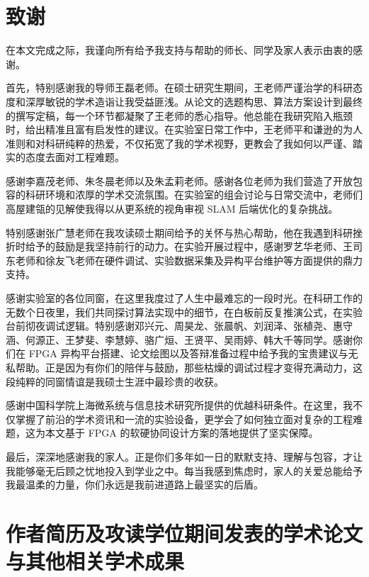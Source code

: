 \chapter[致谢]{致\quad 谢}

在本文完成之际，我谨向所有给予我支持与帮助的师长、同学及家人表示由衷的感谢。

首先，特别感谢我的导师王磊老师。在硕士研究生期间，王老师严谨治学的科研态度和深厚敏锐的学术造诣让我受益匪浅。从论文的选题构思、算法方案设计到最终的撰写定稿，每一个环节都凝聚了王老师的悉心指导。他总能在我研究陷入瓶颈时，给出精准且富有启发性的建议。在实验室日常工作中，王老师平和谦逊的为人准则和对科研纯粹的热爱，不仅拓宽了我的学术视野，更教会了我如何以严谨、踏实的态度去面对工程难题。

感谢李嘉茂老师、朱冬晨老师以及朱孟莉老师。感谢各位老师为我们营造了开放包容的科研环境和浓厚的学术交流氛围。在实验室的组会讨论与日常交流中，老师们高屋建瓴的见解使我得以从更系统的视角审视 SLAM 后端优化的复杂挑战。

特别感谢张广慧老师在我攻读硕士期间给予的关怀与热心帮助，他在我遇到科研挫折时给予的鼓励是我坚持前行的动力。在实验开展过程中，感谢罗艺华老师、王司东老师和徐友飞老师在硬件调试、实验数据采集及异构平台维护等方面提供的鼎力支持。

感谢实验室的各位同窗，在这里我度过了人生中最难忘的一段时光。在科研工作的无数个日夜里，我们共同探讨算法实现中的细节，在白板前反复推演公式，在实验台前彻夜调试逻辑。特别感谢邓兴元、周昊龙、张晨帆、刘润泽、张植尧、惠守涵、何源正、王梦斐、李慧婷、骆广烜、王贤平、吴雨婷、韩大千等同学。感谢你们在 FPGA 异构平台搭建、论文绘图以及答辩准备过程中给予我的宝贵建议与无私帮助。正是因为有你们的陪伴与鼓励，那些枯燥的调试过程才变得充满动力，这段纯粹的同窗情谊是我硕士生涯中最珍贵的收获。

感谢中国科学院上海微系统与信息技术研究所提供的优越科研条件。在这里，我不仅掌握了前沿的学术资讯和一流的实验设备，更学会了如何独立面对复杂的工程难题，这为本文基于 FPGA 的软硬协同设计方案的落地提供了坚实保障。

最后，深深地感谢我的家人。正是你们多年如一日的默默支持、理解与包容，才让我能够毫无后顾之忧地投入到学业之中。每当我感到焦虑时，家人的关爱总能给予我最温柔的力量，你们永远是我前进道路上最坚实的后盾。

\chapter{作者简历及攻读学位期间发表的学术论文与其他相关学术成果}

